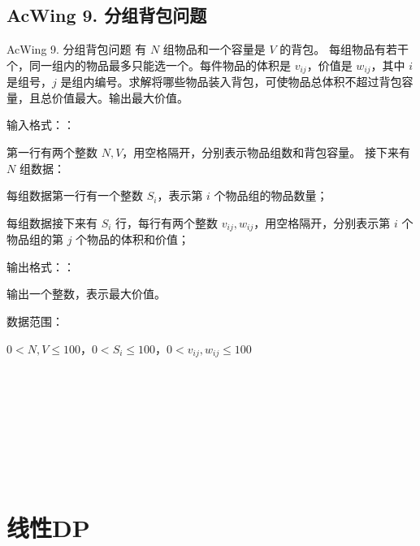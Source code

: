 \subsection{AcWing 9. 分组背包问题}
\begin{titledbox}{AcWing 9. 分组背包问题}
    有 $N$ 组物品和一个容量是 $V$ 的背包。 每组物品有若干个，同一组内的物品最多只能选一个。每件物品的体积是 $v_{ij}$，价值是 $w_{ij}$，其中 $i$ 是组号，$j$ 是组内编号。求解将哪些物品装入背包，可使物品总体积不超过背包容量，且总价值最大。输出最大价值。

    输入格式：：

    第一行有两个整数 $N, V$，用空格隔开，分别表示物品组数和背包容量。 接下来有 $N$ 组数据：
    \begin{mylist}
        \item 每组数据第一行有一个整数 $S_i$，表示第 $i$ 个物品组的物品数量；
        \item 每组数据接下来有 $S_i$ 行，每行有两个整数 $v_{ij}, w_{ij}$，用空格隔开，分别表示第 $i$ 个物品组的第 $j$ 个物品的体积和价值；
    \end{mylist}

    输出格式：：

    输出一个整数，表示最大价值。

    数据范围：

    $0  < N, V \le 100$，$0  < S_i \le 100$，$0  < v_{ij}, w_{ij} \le 100$

    \begin{inputblock}
         \\
         \\
         \\
         \\
         \\
         \\
         \\
    \end{inputblock}
    \begin{outputblock}
    \end{outputblock}
\end{titledbox}


\section{线性DP}

